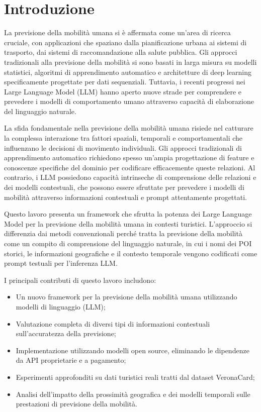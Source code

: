 \chapter{Introduzione}

La previsione della mobilità umana si è affermata come un'area di ricerca cruciale, 
con applicazioni che spaziano dalla pianificazione urbana ai sistemi di trasporto, 
dai sistemi di raccomandazione alla salute pubblica. 
Gli approcci tradizionali alla previsione della mobilità si sono basati in larga misura 
su modelli statistici, algoritmi di apprendimento automatico e architetture di deep learning 
specificamente progettate per dati sequenziali. 
Tuttavia, i recenti progressi nei Large Language Model (LLM) hanno aperto nuove strade 
per comprendere e prevedere i modelli di comportamento umano attraverso 
capacità di elaborazione del linguaggio naturale.

La sfida fondamentale nella previsione della mobilità umana risiede 
nel catturare la complessa interazione tra fattori spaziali, temporali e comportamentali 
che influenzano le decisioni di movimento individuali. 
Gli approcci tradizionali di apprendimento automatico richiedono spesso 
un'ampia progettazione di feature e conoscenze specifiche del dominio 
per codificare efficacemente queste relazioni. 
Al contrario, i LLM possiedono capacità intrinseche di comprensione 
delle relazioni e dei modelli contestuali, 
che possono essere sfruttate per prevedere i modelli di mobilità 
attraverso informazioni contestuali e prompt attentamente progettati.

Questo lavoro presenta un framework che sfrutta la potenza 
dei Large Language Model per la previsione della mobilità umana in contesti turistici. 
L’approccio si differenzia dai metodi convenzionali perché tratta la previsione 
della mobilità come un compito di comprensione del linguaggio naturale, 
in cui i nomi dei POI storici, le informazioni geografiche e il contesto temporale 
vengono codificati come prompt testuali per l'inferenza LLM.

I principali contributi di questo lavoro includono:
\begin{itemize}
    \item Un nuovo framework per la previsione della mobilità umana utilizzando modelli di linguaggio (LLM);
    \item Valutazione completa di diversi tipi di informazioni contestuali sull'accuratezza della previsione;
    \item Implementazione utilizzando modelli open source, eliminando le dipendenze da API proprietarie e a pagamento;
    \item Esperimenti approfonditi su dati turistici reali tratti dal dataset VeronaCard;
    \item Analisi dell'impatto della prossimità geografica e dei modelli temporali sulle prestazioni di previsione della mobilità.
\end{itemize}